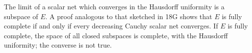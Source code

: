The limit of a scalar net which converges in the Hausdorff uniformity is a subspace of $E$. A proof analogous to that sketched in 18G shows that $E$ is fully complete if and only if every decreasing Cauchy scalar net converges. If $E$ is fully complete, the space of all closed subspaces is complete, with the Hausdorff uniformity; the converse is not true.
